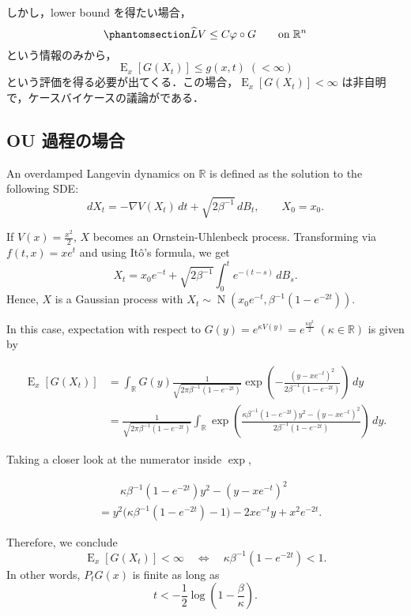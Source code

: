 \documentclass[
]{article}
\begin{document}
しかし，lower bound を得たい場合，
\begin{equation}\phantomsection\label{eq-drift-condition}{
\widehat{L}V\le C\varphi\circ G\qquad\mathrm{on}\;\mathbb{R}^n
}\end{equation} という情報のみから， \[
\operatorname{E}_x[G(X_t)]\le g(x,t)\;(<\infty)
\]
という評価を得る必要が出てくる．この場合，\(\operatorname{E}_x[G(X_t)]<\infty\)
は非自明で，ケースバイケースの議論がである．

\subsection{OU 過程の場合}\label{ou-ux904eux7a0bux306eux5834ux5408}

An overdamped Langevin dynamics on \(\mathbb{R}\) is defined as the
solution to the following SDE: \[
dX_t=-\nabla V(X_t)\,dt+\sqrt{2\beta^{-1}}\,dB_t,\qquad X_0=x_0.
\]

If \(V(x)=\frac{x^2}{2}\), \(X\) becomes an Ornstein-Uhlenbeck process.
Transforming via \(f(t,x)=xe^t\) and using Itô's formula, we get \[
X_t=x_0e^{-t}+\sqrt{2\beta^{-1}}\int^t_0e^{-(t-s)}\,dB_s.
\] Hence, \(X\) is a Gaussian process with
\(X_t\sim\operatorname{N}\left(x_0e^{-t},\beta^{-1}(1-e^{-2t})\right)\).

In this case, expectation with respect to
\(G(y)=e^{\kappa V(y)}=e^{\frac{\kappa y^2}{2}}\;(\kappa\in\mathbb{R})\)
is given by

\begin{align*}
    \operatorname{E}_x[G(X_t)]&=\int_{\mathbb{R}} G(y)\frac{1}{\sqrt{2\pi\beta^{-1}(1-e^{-2t})}}\exp\left(-\frac{(y-xe^{-t})^2}{2\beta^{-1}(1-e^{-2t})}\right)\,dy\\
    &=\frac{1}{\sqrt{2\pi\beta^{-1}(1-e^{-2t})}}\int_{\mathbb{R}}\exp\left(\frac{\kappa\beta^{-1}(1-e^{-2t})y^2-(y-xe^{-t})^2}{2\beta^{-1}(1-e^{-2t})}\right)\,dy.
\end{align*}

Taking a closer look at the numerator inside \(\exp\),

\begin{align*}
    &\qquad\kappa\beta^{-1}(1-e^{-2t})y^2-(y-xe^{-t})^2\\
    &=y^2\biggr(\kappa\beta^{-1}(1-e^{-2t})-1\biggl)-2xe^{-t}y+x^2e^{-2t}.
\end{align*}

Therefore, we conclude \[
\operatorname{E}_x[G(X_t)]<\infty\quad\Leftrightarrow\quad\kappa\beta^{-1}(1-e^{-2t})<1.
\] In other words, \(P_tG(x)\) is finite as long as \[
t<-\frac{1}{2}\log\left(1-\frac{\beta}{\kappa}\right).
\]
\end{document}
